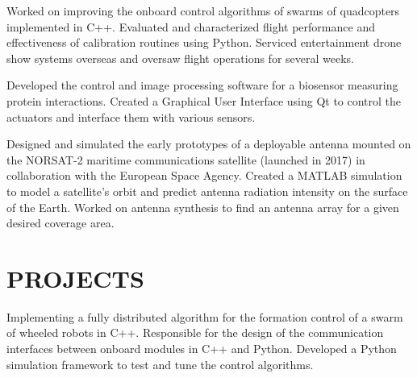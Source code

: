 \documentclass{ResumeTemplate}
\begin{document}

	\workitemsthree
	{Worked on improving the onboard control algorithms of swarms of quadcopters implemented in C++.}
	{Evaluated and characterized flight performance and effectiveness of calibration routines using Python.}
	{Serviced entertainment drone show systems overseas and oversaw flight operations for several weeks.}
	
	
	\workitemstwo
	{Developed the control and image processing software for a biosensor measuring protein interactions.}
	{Created a Graphical User Interface using Qt to control the actuators and interface them with various sensors.}
	

	\workitemstwo
	{Designed and simulated the early prototypes of a deployable antenna mounted on the NORSAT-2 maritime communications satellite (launched in 2017) in collaboration with the European Space Agency.}
	{Created a MATLAB simulation to model a satellite's orbit and predict antenna radiation intensity on the surface of the Earth. Worked on antenna synthesis to find an antenna array for a given desired coverage area.}
	
	\section{PROJECTS}
	

	\workitemsthree
	{Implementing a fully distributed algorithm for the formation control of a swarm of wheeled robots in C++.}
	{Responsible for the design of the communication interfaces between onboard modules in C++ and Python.}
	{Developed a Python simulation framework to test and tune the control algorithms. }
	
\end{document}
